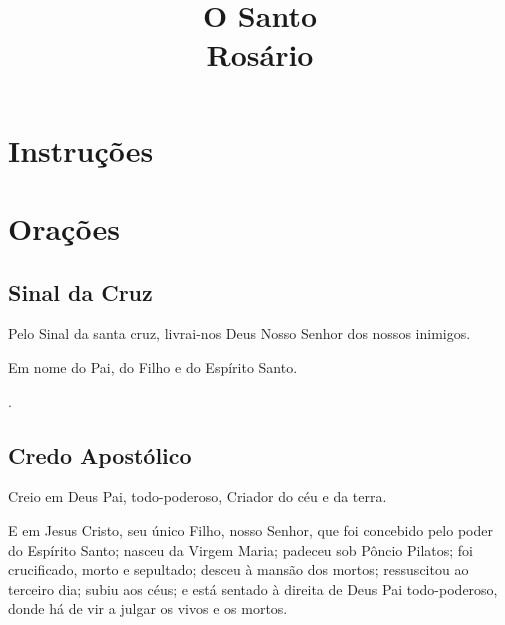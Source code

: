 \documentclass{rosario}
\begin{document}
\title{O Santo\\Rosário}
\author{}
\date{}

\maketitle


\chapter{Instruções}

\begin{center}
    
\end{center}

\TODO


\chapter{Orações}


\section{Sinal da Cruz}

Pelo Sinal da santa cruz, livrai-nos Deus Nosso Senhor dos nossos inimigos.

Em nome do Pai, do Filho e do Espírito Santo.

\amen.


\section{Credo Apostólico}

Creio em Deus Pai, todo-poderoso, Criador do céu e da terra.

E em Jesus Cristo, seu único Filho, nosso Senhor,
que foi concebido pelo poder do Espírito Santo;
nasceu da Virgem Maria;
padeceu sob Pôncio Pilatos;
foi crucificado, morto e sepultado;
desceu à mansão dos mortos;
ressuscitou ao terceiro dia;
subiu aos céus;
e está sentado à direita de Deus Pai todo-poderoso,
donde há de vir a julgar os vivos e os mortos.
\end{document}
